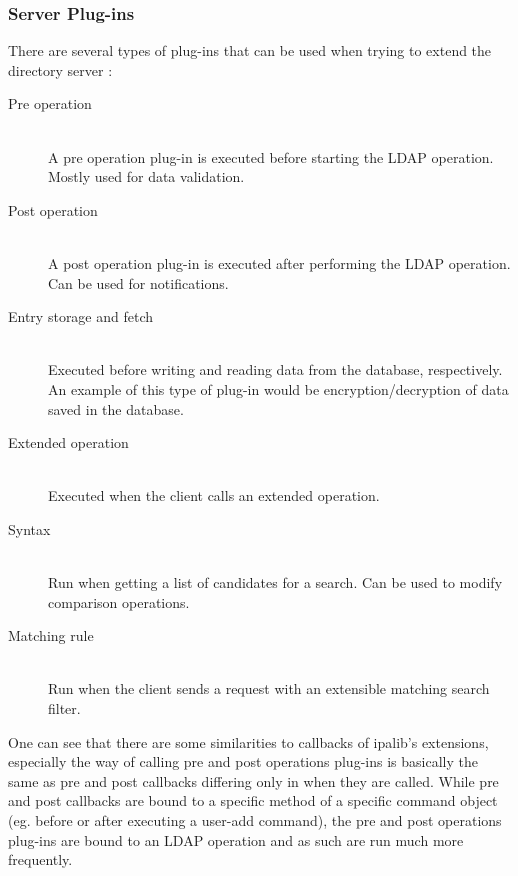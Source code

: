 \subsubsection{Server Plug-ins}
There are several types of plug-ins that can be used when trying to extend the directory server \cite{extLDAP}:
\begin{description}
    \item[Pre operation]\hfill \\A pre operation plug-in is executed before starting the LDAP operation. Mostly used for data validation.
    \item[Post operation]\hfill \\A post operation plug-in is executed after performing the LDAP operation. Can be used for notifications.
    \item[Entry storage and fetch]\hfill \\Executed before writing and reading data from the database, respectively. An example of this type of plug-in would be encryption/decryption of data saved in the database.
    \item[Extended operation]\hfill \\Executed when the client calls an extended operation.
    \item[Syntax]\hfill \\Run when getting a list of candidates for a search. Can be used to modify comparison operations.
    \item[Matching rule]\hfill \\Run when the client sends a request with an extensible matching search filter.
\end{description}
One can see that there are some similarities to callbacks of ipalib's extensions, especially the way of calling pre and post operations plug-ins is basically the same as pre and post callbacks
differing only in when they are called. While pre and post callbacks are bound to a specific method of a specific command object (eg. before or after executing a user-add command),
the pre and post operations plug-ins are bound to an LDAP operation and as such are run much more frequently.

